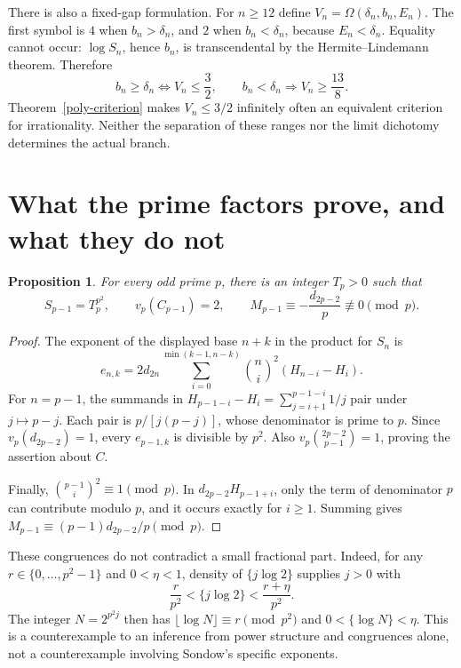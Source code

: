 \documentclass[11pt,a4paper]{article}
\newtheorem{proposition}[theorem]{Proposition}
\theoremstyle{remark}\newtheorem{remark}[theorem]{Remark}
\begin{document}
There is also a fixed-gap formulation. For $n\ge12$ define
$V_n=\Omega(\delta_n,b_n,E_n)$. The first symbol is $4$ when $b_n>\delta_n$,
and $2$ when $b_n<\delta_n$, because $E_n<\delta_n$.
Equality cannot occur: $\log S_n$, hence $b_n$, is transcendental by the
Hermite--Lindemann theorem. Therefore
\[
 b_n\ge\delta_n\iff V_n\le\frac32,
 \qquad b_n<\delta_n\Longrightarrow V_n\ge\frac{13}{8}.
\]
Theorem~\ref{poly-criterion} makes $V_n\le3/2$ infinitely often an equivalent
criterion for irrationality. Neither the separation of these ranges nor the
limit dichotomy determines the actual branch.

\section{What the prime factors prove, and what they do not}
\begin{proposition}\label{prime-power}
For every odd prime $p$, there is an integer $T_p>0$ such that
\[
 S_{p-1}=T_p^{p^2},\qquad v_p(C_{p-1})=2,\qquad
 M_{p-1}\equiv-\frac{d_{2p-2}}p\not\equiv0\pmod p.
\]
\end{proposition}
\begin{proof}
The exponent of the displayed base $n+k$ in the product for $S_n$ is
\[
 e_{n,k}=2d_{2n}\sum_{i=0}^{\min(k-1,n-k)}
             \binom ni^2(H_{n-i}-H_i).
\]
For $n=p-1$, the summands in
$H_{p-1-i}-H_i=\sum_{j=i+1}^{p-1-i}1/j$ pair under $j\mapsto p-j$.
Each pair is $p/[j(p-j)]$, whose denominator is prime to $p$.
Since $v_p(d_{2p-2})=1$, every $e_{p-1,k}$ is divisible by $p^2$.
Also $v_p\binom{2p-2}{p-1}=1$, proving the assertion about $C$.

Finally, $\binom{p-1}{i}^2\equiv1\pmod p$. In $d_{2p-2}H_{p-1+i}$,
only the term of denominator $p$ can contribute modulo $p$, and it occurs
exactly for $i\ge1$. Summing gives
$M_{p-1}\equiv(p-1)d_{2p-2}/p\pmod p$.
\end{proof}

These congruences do not contradict a small fractional part. Indeed, for any
$r\in\{0,\ldots,p^2-1\}$ and $0<\eta<1$, density of
$\{j\log2\}$ supplies $j>0$ with
\[
 \frac r{p^2}<\{j\log2\}<\frac{r+\eta}{p^2}.
\]
The integer $N=2^{p^2j}$ then has
$\lfloor\log N\rfloor\equiv r\pmod{p^2}$ and
$0<\{\log N\}<\eta$. This is a counterexample to an inference from power
structure and congruences alone, not a counterexample involving Sondow's
specific exponents.
\end{document}
